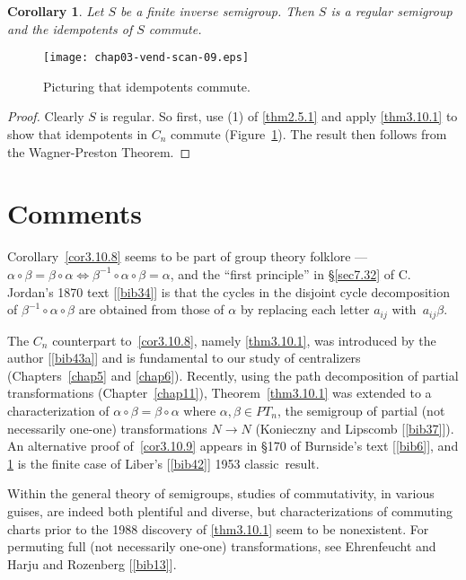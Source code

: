 \documentclass{surv-l}
\numberwithin{equation}{section}
\numberwithin{table}{section}
\numberwithin{figure}{section}
\theoremstyle{plain}
\newtheorem{corollary}[equation]{Corollary}
\theoremstyle{definition}
\begin{document}
\begin{corollary}\label{cor3.10.10}
Let $S$ be a finite inverse semigroup. Then
$S$ is a regular semigroup and the idempotents of $S$ commute.
\end{corollary}

\setcounter{figure}{10}
\begin{figure}[!h]
\texttt{[image: chap03-vend-scan-09.eps]}
\caption{Picturing that idempotents commute.}\label{fig3.10.11}
\end{figure}

\begin{proof} Clearly $S$ is regular. So first, use (1) of \ref{thm2.5.1} and apply
\ref{thm3.10.1} to show that idempotents in $C_{n}$ commute
(Figure~\ref{fig3.10.11}). The result then follows from the
Wagner-Preston Theorem.
\end{proof}

\section{Comments}\label{sec3.11}

Corollary~\ref{cor3.10.8} seems to be part of group theory
folklore --- $\alpha \circ\beta=\beta\circ\alpha
\Leftrightarrow\beta^{-1}\circ \alpha \circ\beta=\alpha$, and the
``first principle'' in \S\ref{sec7.32} of C.
Jordan's 1870 text
[\ref{bib34}] is that the cycles in the disjoint
cycle decomposition of $\beta^{-1}\circ \alpha \circ\beta$ are
obtained from those of $\alpha$ by replacing each letter $a_{ij}$
with~$a_{ij}\beta$.

The $C_{n}$ counterpart to~\ref{cor3.10.8}, namely
\ref{thm3.10.1}, was introduced by the author
[\ref{bib43a}] and is fundamental to our study
of centralizers (Chapters~\ref{chap5} and \ref{chap6}). Recently,
using the path decomposition of partial transformations
(Chapter~\ref{chap11}), Theorem~\ref{thm3.10.1} was extended to a
characterization of $\alpha \circ\beta=\beta \circ\alpha$ where
$\alpha,\beta\in PT_{n}$, the semigroup of partial (not
necessarily one-one) transformations $N\rightarrow N$
(Konieczny and Lipscomb
[\ref{bib37}]). An alternative proof
of~\ref{cor3.10.9} appears in \S170 of Burnside's text [\ref{bib6}], and \ref{cor3.10.10} is
the finite case of Liber's
[\ref{bib42}] 1953 classic~result.

Within the general theory of semigroups, studies of commutativity,
in various guises, are indeed both plentiful and diverse, but
characterizations of commuting charts
prior to the 1988 discovery of \ref{thm3.10.1} seem to be
nonexistent. For permuting full (not necessarily one-one)
transformations, see Ehrenfeucht and Harju and
Rozenberg [\ref{bib13}].
\end{document}
